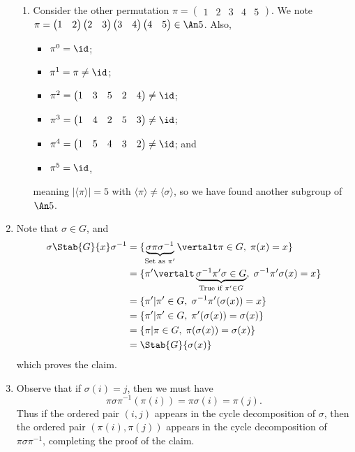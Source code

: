 \begin{enumerate}
\begin{enumerate}[label=(\alph*)]
        \item Consider the other permutation $\pi = \begin{pmatrix}1&2&3&4&5\end{pmatrix}$. We note $\pi = \begin{pmatrix}1&2\end{pmatrix}\begin{pmatrix}2&3\end{pmatrix}\begin{pmatrix}3&4\end{pmatrix}\begin{pmatrix}4&5\end{pmatrix} \in \An5$. Also,
        \begin{itemize}
            \item $\pi^0 = \id$;
            \item $\pi^1 = \pi \neq \id$;
            \item $\pi^2 = \begin{pmatrix}1&3&5&2&4\end{pmatrix} \neq \id$;
            \item $\pi^3 = \begin{pmatrix}1&4&2&5&3\end{pmatrix} \neq \id$;
            \item $\pi^4 = \begin{pmatrix}1&5&4&3&2\end{pmatrix} \neq \id$; and
            \item $\pi^5 = \id$,
        \end{itemize}
        meaning $|\langle \pi \rangle| = 5$ with $\langle \pi \rangle \neq \langle \sigma \rangle$, so we have found another subgroup of $\An5$.
    \end{enumerate}

    \item Note that $\sigma \in G$, and
    \begin{align*}
        \sigma\Stab{G}{x}\sigma^{-1} &= \{\underbrace{\sigma\pi\sigma^{-1}}_{\text{Set as }\pi'} \vertalt \pi \in G,\; \pi(x) = x\}\\
        &= \{\pi' \vertalt \underbrace{\sigma^{-1}\pi'\sigma \in G}_{\text{True if } \pi' \in G},\; \sigma^{-1}\pi'\sigma(x) = x\}\\
        &= \{\pi' \vert \pi' \in G,\; \sigma^{-1}\pi'(\sigma(x)) = x\}\\
        &= \{\pi' \vert \pi' \in G,\; \pi'(\sigma(x)) = \sigma(x)\}\\
        &= \{\pi \vert \pi \in G,\; \pi(\sigma(x)) = \sigma(x)\}\\
        &= \Stab{G}{\sigma(x)}
    \end{align*}
    which proves the claim.

    \item Observe that if $\sigma(i) = j$, then we must have
    \[
        \pi\sigma\pi^{-1}(\pi(i)) = \pi\sigma(i) = \pi(j).  
    \]
    Thus if the ordered pair $(i, j)$ appears in the cycle decomposition of $\sigma$, then the ordered pair $(\pi(i), \pi(j))$ appears in the cycle decomposition of $\pi\sigma\pi^{-1}$, completing the proof of the claim.
\end{enumerate}

